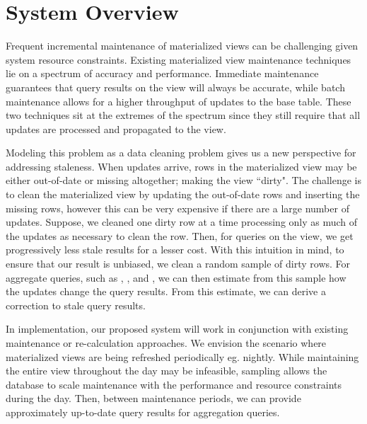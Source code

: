 \section{System Overview}\label{sec-arch}
Frequent incremental maintenance of materialized views can be challenging given system resource constraints.
Existing materialized view maintenance techniques lie on a spectrum of accuracy and performance.
Immediate maintenance guarantees that query results on the view will always be accurate, while batch maintenance allows for a higher throughput of updates to the base table.
These two techniques sit at the extremes of the spectrum since they still require that all updates are processed and propagated to the view.

Modeling this problem as a data cleaning problem gives us a new perspective for addressing staleness.
When updates arrive, rows in the materialized view may be either out-of-date or missing altogether; making the view ``dirty".
The challenge is to clean the materialized view by updating the out-of-date rows and inserting the missing rows, however this can be very expensive if there are a large number of updates.
Suppose, we cleaned one dirty row at a time processing only as much of the updates as necessary to clean the row.
Then, for queries on the view, we get progressively less stale results for a lesser cost.
With this intuition in mind, to ensure that our result is unbiased, we clean a random sample of dirty rows.
For aggregate queries, such as \sumfunc, \countfunc, and \avgfunc, we can then estimate from this sample how the updates change the query results.
From this estimate, we can derive a correction to stale query results.


In implementation, our proposed system will work in conjunction with existing maintenance or re-calculation approaches.
We envision the scenario where materialized views are being refreshed periodically eg. nightly.
While maintaining the entire view throughout the day may be infeasible, sampling allows the database to scale maintenance with the performance and resource constraints during the day.
Then, between maintenance periods, we can provide approximately up-to-date query results for aggregation queries.

